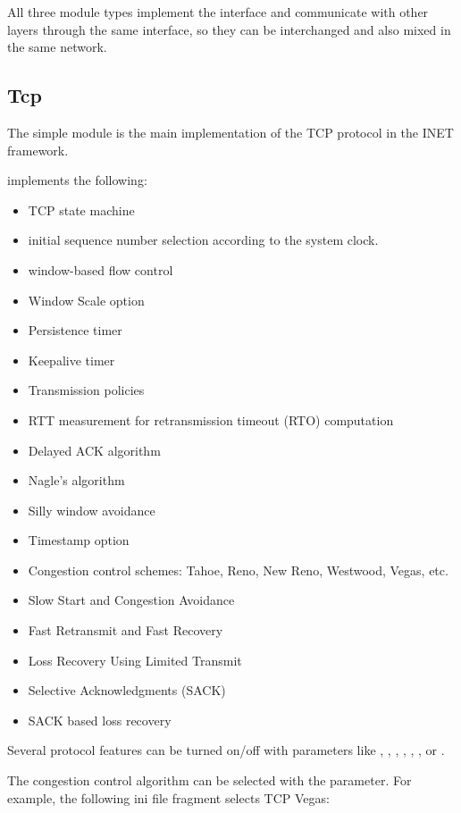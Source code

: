 All three module types implement the  interface and communicate
with other layers through the same interface, so they can be interchanged and
also mixed in the same network.


\subsection{Tcp}
\label{sec:transport:tcp}

The  simple module is the main implementation of the TCP protocol
in the INET framework.

 implements the following:

\begin{itemize}
  \item TCP state machine
  \item initial sequence number selection according to the system clock.
  \item window-based flow control
  \item Window Scale option
  \item Persistence timer
  \item Keepalive timer
  \item Transmission policies
  \item RTT measurement for retransmission timeout (RTO) computation
  \item Delayed ACK algorithm
  \item Nagle's algorithm
  \item Silly window avoidance
  \item Timestamp option
  \item Congestion control schemes: Tahoe, Reno, New Reno, Westwood, Vegas, etc.
  \item Slow Start and Congestion Avoidance
  \item Fast Retransmit and Fast Recovery
  \item Loss Recovery Using Limited Transmit
  \item Selective Acknowledgments (SACK)
  \item SACK based loss recovery
\end{itemize}

Several protocol features can be turned on/off with parameters like
, , ,
, , , or
.

The congestion control algorithm can be selected with the 
parameter. For example, the following ini file fragment selects TCP Vegas:

